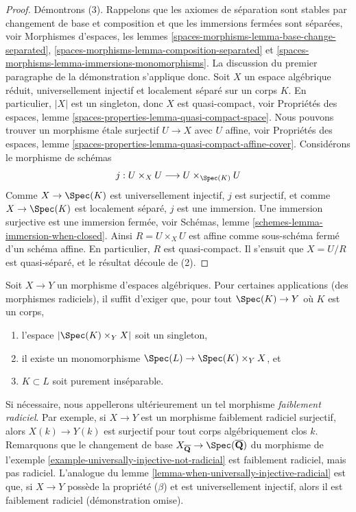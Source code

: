 \begin{proof}
\medskip\noindent
Démontrons (3).
Rappelons que les axiomes de séparation sont stables par changement de base
et composition et que les immersions fermées sont séparées, voir
Morphismes d'espaces,
les lemmes \ref{spaces-morphisms-lemma-base-change-separated},
\ref{spaces-morphisms-lemma-composition-separated} et
\ref{spaces-morphisms-lemma-immersions-monomorphisms}.
La discussion du premier paragraphe de la démonstration s'applique donc.
Soit $X$ un espace algébrique réduit, universellement injectif et
localement séparé sur un corps $K$.
En particulier, $|X|$ est un singleton, donc $X$ est quasi-compact, voir
Propriétés des espaces, lemme \ref{spaces-properties-lemma-quasi-compact-space}.
Nous pouvons trouver un morphisme \'etale surjectif $U \to X$ avec $U$ affine, voir
Propriétés des espaces,
lemme \ref{spaces-properties-lemma-quasi-compact-affine-cover}.
Considérons le morphisme de schémas
$$
j :
U \times_X U
\longrightarrow
U \times_{\Spec(K)} U
$$
Comme $X \to \Spec(K)$ est universellement injectif, $j$ est surjectif,
et comme $X \to \Spec(K)$ est localement séparé, $j$ est une immersion.
Une immersion surjective est une immersion fermée, voir
Schémas, lemme \ref{schemes-lemma-immersion-when-closed}.
Ainsi $R = U \times_X U$ est affine comme sous-schéma fermé d'un schéma affine.
En particulier, $R$ est quasi-compact.
Il s'ensuit que $X = U/R$ est quasi-séparé, et le résultat découle de (2).
\end{proof}

\begin{remark}
\label{remark-weakly-radicial}
Soit $X \to Y$ un morphisme d'espaces algébriques.
Pour certaines applications (des morphismes radiciels),
il suffit d'exiger que, pour tout
$\Spec(K) \to Y$ où $K$ est un corps,
\begin{enumerate}
\item l'espace $|\Spec(K) \times_Y X|$ soit un singleton,
\item il existe un monomorphisme
$\Spec(L) \to \Spec(K) \times_Y X$, et
\item $K \subset L$ soit purement inséparable.
\end{enumerate}
Si nécessaire, nous appellerons ultérieurement un tel morphisme {\it faiblement radiciel}.
Par exemple, si $X \to Y$ est un morphisme faiblement radiciel surjectif,
alors $X(k) \to Y(k)$ est surjectif pour tout corps algébriquement clos $k$.
Remarquons que le changement de base
$X_{\overline{\mathbf{Q}}} \to \Spec(\overline{\mathbf{Q}})$
du morphisme de
l'exemple \ref{example-universally-injective-not-radicial}
est faiblement radiciel, mais pas radiciel. L'analogue du
lemme \ref{lemma-when-universally-injective-radicial}
est que, si $X \to Y$ possède la propriété ($\beta$) et est universellement
injectif, alors il est faiblement radiciel (démonstration omise).
\end{remark}

